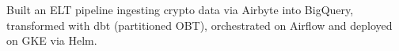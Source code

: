 
\vspace{3pt}
\begin{resume_list}
  \item Built an ELT pipeline ingesting crypto data via Airbyte into BigQuery, transformed with dbt (partitioned OBT), orchestrated on Airflow and deployed on GKE via Helm.
\end{resume_list}
